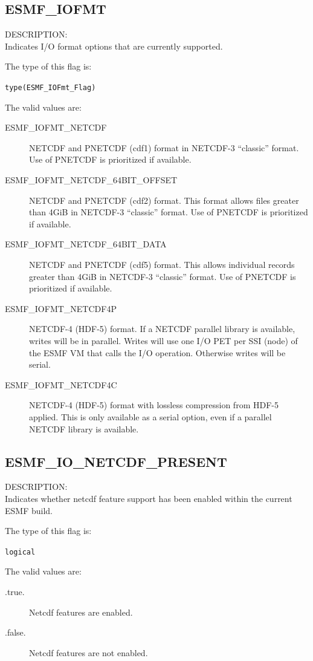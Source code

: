 \subsection{ESMF\_IOFMT}
\label{opt:iofmtflag}
{\sf DESCRIPTION:\\}
Indicates I/O format options that are currently supported.

The type of this flag is:

{\tt type(ESMF\_IOFmt\_Flag)}

The valid values are:
\begin{description}
\item [ESMF\_IOFMT\_NETCDF]
      NETCDF and PNETCDF (cdf1) format in NETCDF-3 ``classic'' format. Use
      of PNETCDF is prioritized if available.
\item [ESMF\_IOFMT\_NETCDF\_64BIT\_OFFSET]
      NETCDF and PNETCDF (cdf2) format.  This format allows files greater
      than 4GiB in NETCDF-3 ``classic'' format.  Use of PNETCDF is prioritized
      if available.
\item [ESMF\_IOFMT\_NETCDF\_64BIT\_DATA]
      NETCDF and PNETCDF (cdf5) format.  This allows individual records greater
      than 4GiB in NETCDF-3 ``classic'' format.  Use of PNETCDF is prioritized
      if available.
\item [ESMF\_IOFMT\_NETCDF4P]
      NETCDF-4 (HDF-5) format.  If a NETCDF parallel library is available,
      writes will be in parallel. Writes will use one I/O PET per
      SSI (node) of the ESMF VM that calls the I/O operation. Otherwise writes
      will be serial.
\item [ESMF\_IOFMT\_NETCDF4C]
      NETCDF-4 (HDF-5) format with lossless compression from HDF-5 applied.
      This is only available as a serial option, even if a parallel NETCDF
      library is available.  
\end{description}

\subsection{ESMF\_IO\_NETCDF\_PRESENT}
\label{const:ionetcdfflag}
{\sf DESCRIPTION:\\}
Indicates whether netcdf feature support has been enabled
within the current ESMF build.

The type of this flag is:

{\tt logical}

The valid values are:
\begin{description}
\item [.true.]
      Netcdf features are enabled.
\item [.false.]
      Netcdf features are not enabled.
\end{description}

